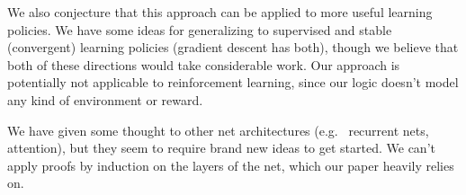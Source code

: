 \documentclass[letterpaper]{article}
\theoremstyle{definition}
\begin{document}

We also conjecture that this approach can be applied to more useful learning policies.  We have some ideas for generalizing to supervised and stable (convergent) learning policies (gradient descent has both), though we believe that both of these directions would take considerable work.  Our approach is potentially not applicable to reinforcement learning, since our logic doesn't model any kind of environment or reward.

We have given some thought to other net architectures (e.g.~ recurrent nets, attention), but they seem to require brand new ideas to get started.  We can't apply proofs by induction on the layers of the net, which our paper heavily relies on.
\end{document}
